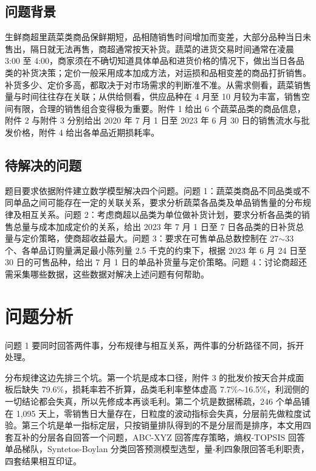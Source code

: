 \documentclass[zihao=-4,a4paper]{ctexart}
\begin{document}
\subsection{问题背景}

生鲜商超里蔬菜类商品保鲜期短，品相随销售时间增加而变差，大部分品种当日未售出，隔日就无法再售，商超通常按天补货。蔬菜的进货交易时间通常在凌晨 3:00 至 4:00，商家须在不确切知道具体单品和进货价格的情况下，做出当日各品类的补货决策；定价一般采用成本加成方法，对运损和品相变差的商品打折销售。补货多少、定价多高，都取决于对市场需求的判断准不准。从需求侧看，蔬菜销售量与时间往往存在关联；从供给侧看，供应品种在 4 月至 10 月较为丰富，销售空间有限，合理的销售组合变得极为重要。附件 1 给出 6 个蔬菜品类的商品信息，附件 2 与附件 3 分别给出 2020 年 7 月 1 日至 2023 年 6 月 30 日的销售流水与批发价格，附件 4 给出各单品近期损耗率。

\subsection{待解决的问题}

题目要求依据附件建立数学模型解决四个问题。问题 1：蔬菜类商品不同品类或不同单品之间可能存在一定的关联关系，要求分析蔬菜各品类及单品销售量的分布规律及相互关系。问题 2：考虑商超以品类为单位做补货计划，要求分析各品类的销售总量与成本加成定价的关系，给出 2023 年 7 月 1 日至 7 日各品类的日补货总量与定价策略，使商超收益最大。问题 3：要求在可售单品总数控制在 27$\sim$33 个、各单品订购量满足最小陈列量 2.5 千克的约束下，根据 2023 年 6 月 24 日至 30 日的可售品种，给出 7 月 1 日的单品补货量与定价策略。问题 4：讨论商超还需采集哪些数据，这些数据对解决上述问题有何帮助。


\section{问题分析}

问题 1 要同时回答两件事，分布规律与相互关系，两件事的分析路径不同，拆开处理。

分布规律这边先排三个坑。第一个坑是成本口径，附件 3 的批发价按天合并成面板后缺失 79.6\%，损耗率若不折算，品类毛利率整体虚高 7.7\%$\sim$16.5\%，利润侧的一切结论都会失真，所以先修成本再谈毛利。第二个坑是数据稀疏，246 个单品铺在 1,095 天上，零销售日大量存在，日粒度的波动指标会失真，分层前先做粒度试验。第三个坑是单一指标定层，只按销量排队得到的不是分层而是排序，本文用四套互补的分层各自回答一个问题，ABC-XYZ 回答库存策略，熵权-TOPSIS 回答单品梯队，Syntetos-Boylan 分类回答预测模型选型，量-利四象限回答毛利职责，四套结果相互印证。
\end{document}
